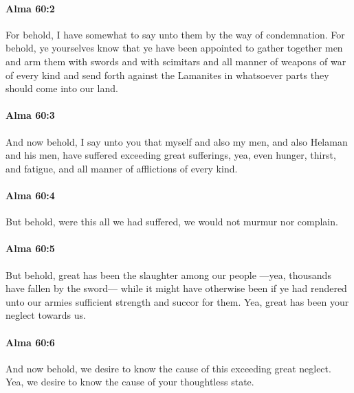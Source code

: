 		\paragraph{Alma 60:2} %
			\label{ALMA-60-2}

			For behold, I have somewhat to say unto them by the way of condemnation.
			For behold, ye yourselves know
			that ye have been appointed to gather together men
			and arm them with swords and with scimitars
			and all manner of weapons of war of every kind
			and send forth against the Lamanites
			in whatsoever parts they should come into our land.

		\paragraph{Alma 60:3} %
			\label{ALMA-60-3}

			And now behold, I say unto you
			that myself and also my men, and also Helaman and his men,
			have suffered exceeding great sufferings,
			yea, even hunger, thirst, and fatigue, and all manner of afflictions of every kind.

		\paragraph{Alma 60:4} %
			\label{ALMA-60-4}

			But behold, were this all we had suffered,
			we would not murmur nor complain.

		\paragraph{Alma 60:5} %
			\label{ALMA-60-5}

			But behold, great has been the slaughter among our people
			---yea, thousands have fallen by the sword---
			while it might have otherwise been
			if ye had rendered unto our armies sufficient strength and succor for them.
			Yea, great has been your neglect towards us.

		\paragraph{Alma 60:6} %
			\label{ALMA-60-6}

			And now behold, we desire to know the cause of this exceeding great neglect.
			Yea, we desire to know the cause of your thoughtless state.

